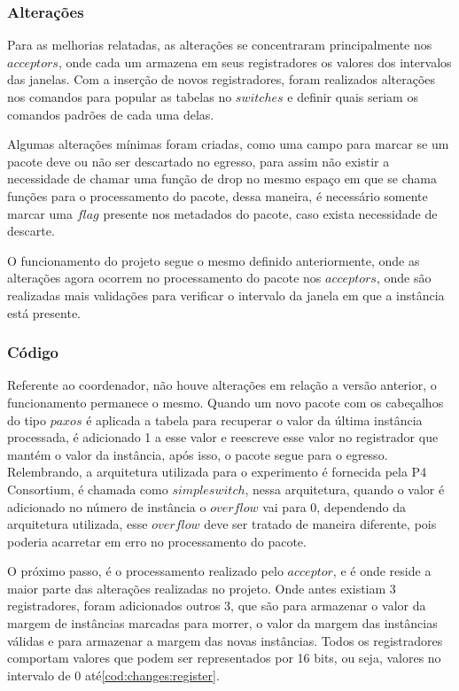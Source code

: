 \documentclass[12pt,
openright, 
oneside,
a4paper,
brazil]{facom-ufu-abntex2}
\theoremstyle{definition}
\begin{document}
\subsubsection{Alterações}
Para as melhorias relatadas, as alterações se concentraram principalmente nos $acceptors$, onde cada um armazena 
em seus registradores os valores dos intervalos das janelas. Com a inserção de novos registradores, foram
realizados alterações nos comandos para popular as tabelas no $switches$ e definir quais seriam os comandos padrões
de cada uma delas.

Algumas alterações mínimas foram criadas, como uma campo para marcar se um pacote deve ou não ser descartado no egresso,
para assim não existir a necessidade de chamar uma função de drop no mesmo espaço em que se chama funções para o
processamento do pacote, dessa maneira, é necessário somente marcar uma $flag$ presente nos metadados do pacote,
caso exista necessidade de descarte.

O funcionamento do projeto segue o mesmo definido anteriormente, onde as alterações agora ocorrem no processamento
do pacote nos $acceptors$, onde são realizadas mais validações para verificar o intervalo da janela em que a instância
está presente.

\subsubsection{Código}
Referente ao coordenador, não houve alterações em relação a versão anterior, o funcionamento permanece o mesmo.
Quando um novo pacote com os cabeçalhos do tipo $paxos$ é aplicada a tabela para recuperar o valor da última instância
processada, é adicionado 1 a esse valor e reescreve esse valor no registrador que mantém o valor da instância, após isso,
o pacote segue para o egresso. Relembrando, a arquitetura utilizada para o experimento é fornecida pela P4 Consortium, é
chamada como $simple switch$, nessa arquitetura, quando o valor é adicionado no número de instância o $overflow$ vai para
0, dependendo da arquitetura utilizada, esse $overflow$ deve ser tratado de maneira diferente, pois poderia acarretar em
erro no processamento do pacote.



O próximo passo, é o processamento realizado pelo $acceptor$, e é onde reside a maior parte das alterações realizadas no projeto.
Onde antes existiam 3 registradores, foram adicionados outros 3, que são para armazenar o valor da margem de instâncias marcadas
para morrer, o valor da margem das instâncias válidas e para armazenar a margem das novas instâncias. Todos os registradores
comportam valores que podem ser representados por 16 bits, ou seja, valores no intervalo de 0 até\ref{cod:changes:register}.
\end{document}
